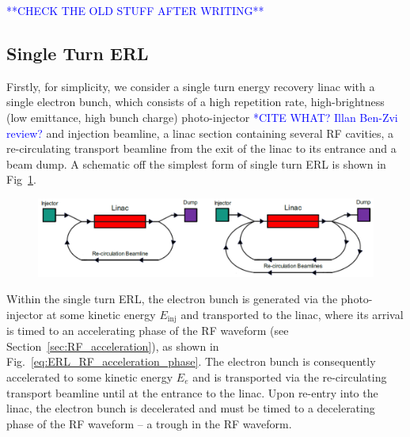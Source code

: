 \documentclass[../main.tex]{subfiles}
\begin{document}
\textcolor{blue}{**CHECK THE OLD STUFF AFTER WRITING**}

\subsection{Single Turn ERL}

Firstly, for simplicity, we consider a single turn energy recovery linac with a single electron bunch, which consists of a high repetition rate, high-brightness (low emittance, high bunch charge) photo-injector \cite{} \textcolor{blue}{*CITE WHAT? Illan Ben-Zvi review?} and injection beamline, a linac section containing several RF cavities, a re-circulating transport beamline from the exit of the linac to its entrance and a beam dump. A schematic off the simplest form of single turn ERL is shown in Fig~\ref{fig:ERL_schematics}. 

\begin{figure}[!h]
\centering
\includegraphics[width=\textwidth]{Figures/Energy_Recovery_Linac_Design/single_multi_turn_ERL.pdf}
\caption{}
\label{fig:ERL_schematics}
\end{figure}


Within the single turn ERL, the electron bunch is generated via the photo-injector at some kinetic energy $E_{\mathrm{inj}}$ and transported to the linac, where its arrival is timed to an accelerating phase of the RF waveform (see Section~\ref{sec:RF_acceleration}), as shown in Fig.~\ref{eq:ERL_RF_acceleration_phase}. The electron bunch is consequently accelerated to some kinetic energy $E_{e}$ and is transported via the re-circulating transport beamline until at the entrance to the linac. Upon re-entry into the linac, the electron bunch is decelerated and must be timed to a decelerating phase of the RF waveform -- a trough in the RF waveform. 
\end{document}
